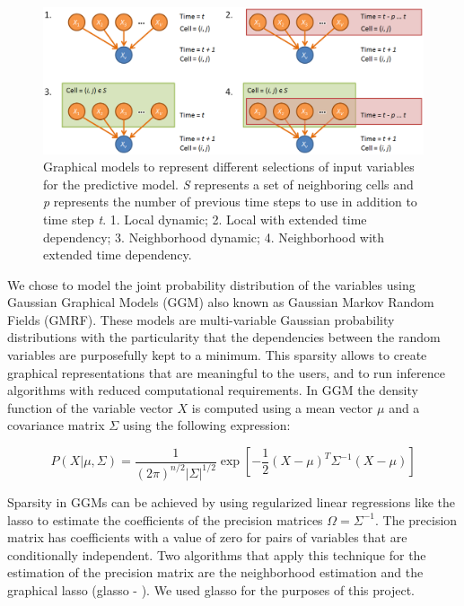 \documentclass{article}
\begin{document}
\begin{center}
\begin{figure}
\includegraphics[width=0.9\columnwidth]{images/plate_models.png}
\caption{Graphical models to represent different
selections of input variables for the predictive model. \textit{S} represents
a set of neighboring cells and \textit{p} represents the number of previous
time steps to use in addition to time step \textit{t}. 1.
Local dynamic; 2. Local with extended time dependency; 3.
Neighborhood dynamic; 4. Neighborhood with extended time
dependency.}\label{fig:plate_models}
\end{figure}
\end{center}

We chose to model the joint probability distribution of the variables using
Gaussian Graphical Models (GGM) also known as Gaussian Markov Random Fields
(GMRF). These models are multi-variable Gaussian probability distributions with
the particularity that the dependencies between the random variables are
purposefully kept to a minimum. This sparsity allows to create graphical
representations that are meaningful to the users, and to run inference
algorithms with reduced computational requirements. In GGM the density function
of the variable vector $X$ is computed using a mean vector $\mu$ and a
covariance matrix $\Sigma$ using the following expression:

\begin{equation}
\label{eq:gaussian}
P(X|\mu,\Sigma) =
\frac{1}{(2\pi)^{n/2}\vert\Sigma\vert^{1/2}} \exp \left [ -\frac{1}{2}(X -
\mu)^T\Sigma^{-1}(X - \mu) \right ]
\end{equation}

Sparsity in GGMs can be achieved by using regularized linear regressions like
the lasso \cite{tibshirani1996} to estimate the coefficients of the precision
matrices $\Omega=\Sigma^{-1}$. The precision matrix has coefficients with a
value of zero for pairs of variables that are conditionally independent. Two
algorithms that apply this technique for the estimation of the precision matrix
are the neighborhood estimation \cite{meinshausen2006} and the graphical lasso
(glasso - \cite{Friedman2008}). We used glasso for the purposes of this project.
\end{document}
